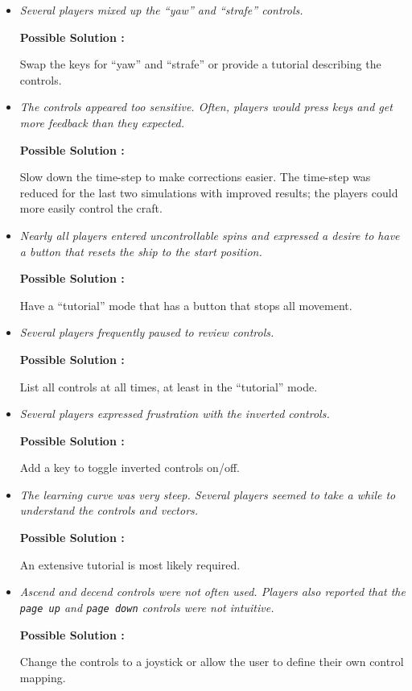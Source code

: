 \begin{itemize}

  \item \emph{Several players mixed up the ``yaw'' and ``strafe'' controls.}
        
        \textbf{Possible Solution : } \parbox[t]{5in}{Swap the keys for ``yaw'' and ``strafe'' or provide a tutorial describing the controls.}
				
  \item \emph{The controls appeared too sensitive. Often, players would press keys and get more feedback than they expected.}
        
        \textbf{Possible Solution : } \parbox[t]{5in}{Slow down the time-step to make corrections easier.  The time-step was reduced for the last two simulations with improved results; the players could more easily control the craft.}
				
  \item \emph{Nearly all players entered uncontrollable spins and expressed a desire to have a button that resets the ship to the start position.}
        
        \textbf{Possible Solution : } \parbox[t]{5in}{Have a ``tutorial'' mode that has a button that stops all movement.}

  \item \emph{Several players frequently paused to review controls.}
        
        \textbf{Possible Solution : } \parbox[t]{5in}{List all controls at all times, at least in the ``tutorial'' mode.}
				
	\item \emph{Several players expressed frustration with the inverted controls.}
        
        \textbf{Possible Solution : } \parbox[t]{5in}{Add a key to toggle inverted controls on/off.}	

	\item \emph{The learning curve was very steep. Several players seemed to take a while to understand the controls and vectors.}
        
        \textbf{Possible Solution : } \parbox[t]{5in}{An extensive tutorial is most likely required.}	

	\item \emph{Ascend and decend controls were not often used.  Players also reported that the \texttt{page up} and \texttt{page down} controls were not intuitive.}
        
        \textbf{Possible Solution : } \parbox[t]{5in}{Change the controls to a joystick or allow the user to define their own control mapping.}


\end{itemize}
